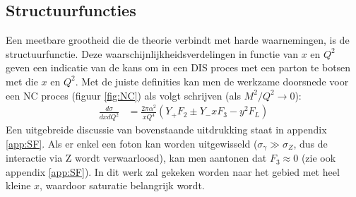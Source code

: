 \documentclass[a4paper,11pt]{article}
\numberwithin{equation}{section} %
\begin{document}
    \subsection{Structuurfuncties}
Een meetbare grootheid die de theorie verbindt met harde waarnemingen, is de structuurfunctie.
Deze waarschijnlijkheidsverdelingen in functie van $x$ en $Q^2$  geven een indicatie van de kans om in een DIS proces met een parton te botsen met die $x$ en $Q^2$.
Met de juiste definities kan men de werkzame doorsnede voor een NC proces (figuur \ref{fig:NC}) als volgt schrijven (als $M^2/Q^2 \rightarrow 0$):
\begin{align} \label{eq:SF}
\frac{d\sigma}{dxdQ^2} &= \frac{2\pi \alpha^2}{xQ^4} \left(Y_+ F_2 \pm Y_- x F_3 - y^2 F_L \right)
\end{align}
Een uitgebreide discussie van bovenstaande uitdrukking staat in appendix \ref{app:SF}.
Als er enkel een foton kan worden uitgewisseld ($\sigma_\gamma \gg \sigma_Z$, dus de interactie via Z wordt verwaarloosd), kan men aantonen dat $F_3 \approx 0$ (zie ook appendix \ref{app:SF}).
In dit werk zal gekeken worden naar het gebied met heel kleine $x$, waardoor saturatie belangrijk wordt.
\end{document}
